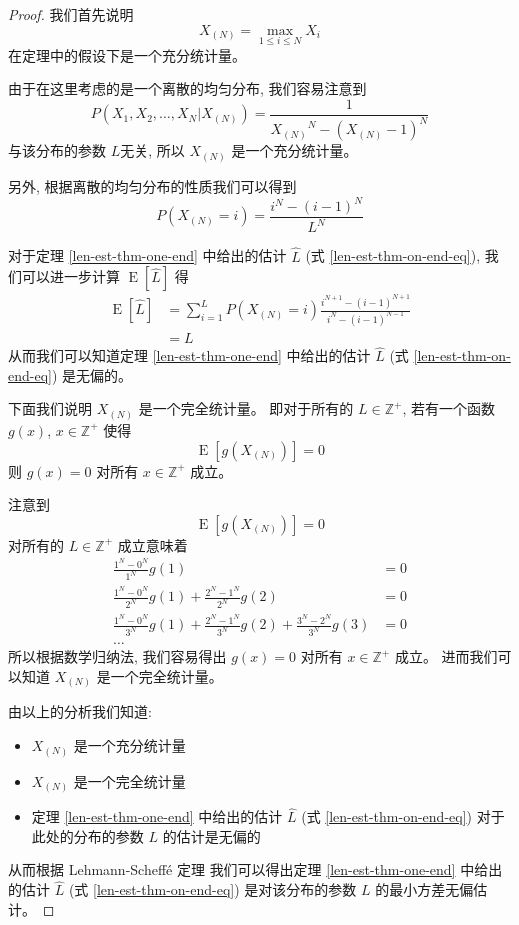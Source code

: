 \begin{proof}
我们首先说明 
\[
X_{(N)} = \max_{1 \leq i \leq N} X_i
\] 
在定理中的假设下是一个充分统计量。 

由于在这里考虑的是一个离散的均匀分布, 我们容易注意到
\[
P(X_1, X_2, \ldots, X_N | X_{(N)}) = \frac{1}{ {X_{(N)}}^N - (X_{(N)} - 1)^N }
\]
与该分布的参数 $L$无关, 所以 $X_{(N)}$ 是一个充分统计量。 

另外, 根据离散的均匀分布的性质我们可以得到
\[
P(X_{(N)} = i) = \frac{ i^N - (i - 1)^N }{L^N}
\]

对于定理 \ref{len-est-thm-one-end} 中给出的估计 $\hat{L}$ 
(式 \eqref{len-est-thm-on-end-eq}), 
我们可以进一步计算 $\operatorname{E}[\hat{L}]$ 得
\begin{align*}
\operatorname{E}[\hat{L}] &= \sum_{i=1}^L P(X_{(N)} = i) 
    \frac{i^{N+1} - (i-1)^{N+1}}{i^N-(i-1)^{N-1}} \\
&= L
\end{align*}
从而我们可以知道定理 \ref{len-est-thm-one-end} 中给出的估计 $\hat{L}$ 
(式 \eqref{len-est-thm-on-end-eq}) 是无偏的。 

下面我们说明 $X_{(N)}$ 是一个完全统计量。 
即对于所有的 $L \in \mathbb{Z}^+$, 若有一个函数 $g(x)$, $x \in \mathbb{Z}^+$ 使得
\[
\operatorname{E}[g(X_{(N)})] = 0
\]
则 $g(x) = 0$ 对所有 $x \in \mathbb{Z}^+$ 成立。 

注意到
\[
\operatorname{E}[g(X_{(N)})] = 0
\]
对所有的 $L \in \mathbb{Z}^+$ 成立意味着
\begin{align*}
\frac{1^N - 0^N}{1^N} g(1) &= 0 \\
\frac{1^N - 0^N}{2^N} g(1) + \frac{2^N - 1^N}{2^N} g(2) &= 0 \\
\frac{1^N - 0^N}{3^N} g(1) + \frac{2^N - 1^N}{3^N} g(2) + \frac{3^N - 2^N}{3^N} g(3) &= 0 \\
\ldots
\end{align*}
所以根据数学归纳法, 我们容易得出 $g(x) = 0$ 对所有 $x \in \mathbb{Z}^+$ 成立。 
进而我们可以知道 $X_{(N)}$ 是一个完全统计量。 

由以上的分析我们知道: 
\begin{itemize}
\item $X_{(N)}$ 是一个充分统计量
\item $X_{(N)}$ 是一个完全统计量
\item 定理 \ref{len-est-thm-one-end} 中给出的估计 $\hat{L}$ 
(式 \eqref{len-est-thm-on-end-eq}) 对于此处的分布的参数 $L$ 的估计是无偏的 
\end{itemize}
从而根据 Lehmann-Scheff{\'e} 定理
\cite{lehmann2012completeness.p1, lehmann2012completeness.p2} 
我们可以得出定理 \ref{len-est-thm-one-end} 中给出的估计 $\hat{L}$ 
(式 \eqref{len-est-thm-on-end-eq}) 是对该分布的参数 $L$ 的最小方差无偏估计。 

\end{proof}

